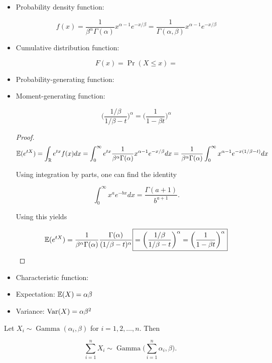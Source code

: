 \begin{itemize}

\item Probability density function: 

\[
f(x)  = \frac{1}{\beta^\alpha\Gamma(\alpha)} x^{\alpha - 1} e^{-x/\beta} = \frac{1}{\Gamma(\alpha, \beta)} x^{\alpha - 1} e^{-x/\beta}
\]

\item Cumulative distribution function: 

\[
F(x) = \Pr(X \leq x) =
\]

\item Probability-generating function:

\item Moment-generating function:

\[
\bigg( \frac{1/\beta}{1/\beta - t} \bigg)^{\alpha} = \bigg(\frac{1}{1- \beta t} \bigg)^{\alpha}
\]

\begin{proof}
\[
\mathbb{E}(e^{tX}) = \int_{\mathbb{R}} e^{tx} f(x) dx = \int_0^\infty e^{tx} \frac{1}{\beta^\alpha\Gamma(\alpha)} x^{\alpha - 1} e^{-x/\beta}  dx =  \frac{1}{\beta^\alpha\Gamma(\alpha)} \int_0^\infty x^{\alpha - 1} e^{-x(1/\beta - t)}  dx
\]

Using integration by parts, one can find the identity

\[
\int_0^\infty x^a e^{-b x} dx = \frac{\Gamma(a+1)}{b^{a + 1}}.
\]

Using this yields

\[
\mathbb{E}(e^{tX}) = \frac{1}{\beta^\alpha\Gamma(\alpha)}   \frac{\Gamma(\alpha)}{(1/\beta - t)^{\alpha}}  \boxed{ = \bigg(\frac{1/\beta}{1/\beta - t} \bigg)^{\alpha} = \bigg(\frac{1}{1- \beta t} \bigg)^{\alpha}}
\]
\end{proof}

\item Characteristic function:

\item Expectation: \(\mathbb{E}(X) = \alpha \beta \)

\item Variance: \(\mathrm{Var}(X) = \alpha \beta^2 \)

\end{itemize}

\begin{proposition}\label{prob.gammasum}Let \(X_i \sim \operatorname{Gamma}(\alpha_i, \beta)\) for \(i = 1, 2, \ldots, n\). Then 

\[
\sum_{i=1}^n X_i \sim \operatorname{Gamma} \bigg( \sum_{i=1}^n \alpha_i, \beta \bigg).
\] 
\end{proposition}

